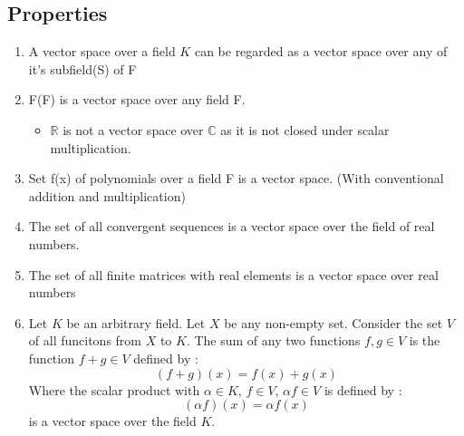 \documentclass[twoside]{article}
\begin{document}
	\subsection{Properties}
	\begin{enumerate}
		\item A vector space over a field $K$ can be regarded as a vector space over any of it's subfield(S) of F
		\item F(F) is a vector space over any field F.
			\begin{itemize}
				\item $\mathbb{R}$ is not a vector space over $\mathbb{C}$ as it is not closed under scalar multiplication.
			\end{itemize}
		\item Set f(x) of polynomials over a field F is a vector space. (With conventional addition and multiplication)
		\item The set of all convergent sequences is a vector space over the field of real numbers.
		\item The set of all finite matrices with real elements is a vector space over real numbers
		\item Let $K$ be an arbitrary field. Let $X$ be any non-empty set. Consider the set $V$ of all funcitons from $X$ to $K$. The sum of any two functions $f,g \in V$ is the function $f + g \in V$ defined by : 
		\[(f+g)(x) = f(x) + g(x)\]
		Where the scalar product with $\alpha \in K$, $f \in V$, $\alpha f \in V$ is defined by :
		\[(\alpha f)(x) = \alpha f(x)\]
		is a vector space over the field $K$.
	\end{enumerate}
\end{document}

